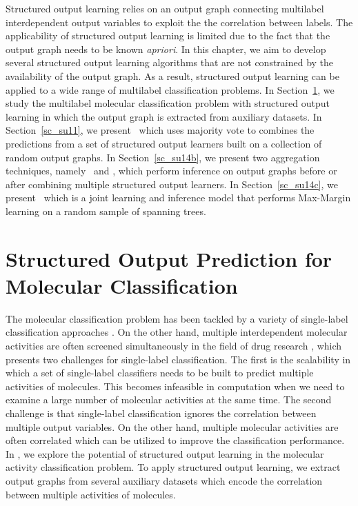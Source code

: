 {Structured output learning relies on an output graph connecting multilabel interdependent output variables to exploit the the correlation between labels.
The applicability of structured output learning is limited due to the fact that the output graph needs to be known \textit{apriori}.
In this chapter, we aim to develop several structured output learning algorithms that are not constrained by the availability of the output graph.
As a result, structured output learning can be applied to a wide range of multilabel classification problems.
In Section~\ref{sc_su10}, we study the multilabel molecular classification problem with structured output learning in which the output graph is extracted from auxiliary datasets.
In Section~\ref{sc_su11}, we present \mve\ which uses majority vote to combines the predictions from a set of structured output learners built on a collection of random output graphs.
In Section~\ref{sc_su14b}, we present two aggregation techniques, namely \amm\ and \mam, which perform inference on output graphs before or after combining multiple structured output learners.
In Section~\ref{sc_su14c}, we present \rta\ which is a joint learning and inference model that performs Max-Margin learning on a random sample of spanning trees.



%
%
\section{Structured Output Prediction for Molecular Classification} \label{sc_su10}

The molecular classification problem has been tackled by a variety of single-label classification approaches \citep{Menchetti05weighted,Singh12qsar,Dutt12classification}.
On the other hand, multiple interdependent molecular activities are often screened simultaneously in the field of drug research \citep{Shoemaker06the}, which presents two challenges for single-label classification.
The first is the scalability in which a set of single-label classifiers needs to be built to predict multiple activities of molecules.
This becomes infeasible in computation when we need to examine a large number of molecular activities at the same time.
The second challenge is that single-label classification ignores the correlation between multiple output variables.
On the other hand, multiple molecular activities are often correlated which can be utilized to improve the classification performance.
In , we explore the potential of structured output learning in the molecular activity classification problem.
To apply structured output learning, we extract output graphs from several auxiliary datasets which encode the correlation between multiple activities of molecules.


}
